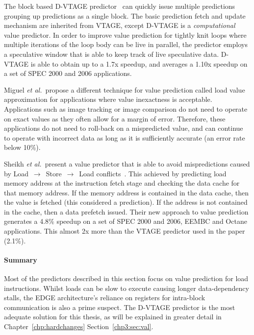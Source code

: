 The block based D-VTAGE predictor~\cite{peraisBeBop2015} can quickly issue multiple predictions grouping up predictions as a single block.
The basic prediction fetch and update mechanism are inherited from VTAGE, except D-VTAGE is a \textit{computational} value predictor.
In order to improve value prediction for tightly knit loops where multiple iterations of the loop body can be live in parallel, the predictor employs a speculative window that is able to keep track of live speculative data.
D-VTAGE is able to obtain up to a 1.7x speedup, and averages a 1.10x speedup on a set of SPEC 2000 and 2006 applications. 

Miguel {\it et al.~}propose a different technique for value prediction called load value approximation \cite{miguel2014LoadVal} for applications where value inexactness is acceptable.
Applications such as image tracking or image comparison do not need to operate on exact values as they often allow for a margin of error.
Therefore, these applications do not need to roll-back on a mispredicted value, and can continue to operate with incorrect data as long as it is sufficiently accurate (an error rate below 10\%).

Sheikh {\it et al.~}present a value predictor that is able to avoid mispredictions caused by Load $\,\to\,$ Store $\,\to\,$ Load conflicts~\cite{sheikh2017value}.
This achieved by predicting load memory address at the instruction fetch stage and checking the data cache for that memory address.
If the memory address is contained in the data cache, then the value is fetched (this considered a prediction).
If the address is not contained in the cache, then a data prefetch issued.
Their new approach to value prediction generates a 4.8\% speedup on a set of SPEC 2000 and 2006, EEMBC and Octane applications.
This almost 2x more than the VTAGE predictor used in the paper (2.1\%).

\paragraph*{Summary}
Most of the predictors described in this section focus on value prediction for load instructions.
Whilst loads can be slow to execute causing longer data-dependency stalls, the EDGE architecture's reliance on registers for intra-block communication is also a prime suspect.
The D-VTAGE predictor is the most adequate solution for this thesis, as will be explained in greater detail in Chapter~\ref{chp:hardchanges} Section~\ref{chp3:sec:val}.

